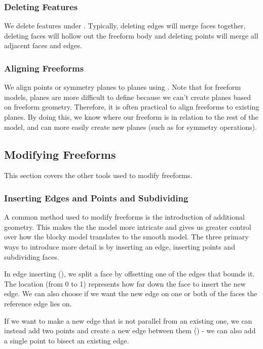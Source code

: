 \subsubsection{Deleting Features}
\easydifficulty
We delete features under . Typically, deleting edges will merge faces together, deleting faces will hollow out the freeform body and deleting points will merge all adjacent faces and edges.

\subsubsection{Aligning Freeforms}
We align points or symmetry planes to planes using . Note that for freeform models, planes are more difficult to define because we can't create planes based on freeform geometry. Therefore, it is often practical to align freeforms to existing planes. By doing this, we know where our freeform is in relation to the rest of the model, and can more easily create new planes (such as for symmetry operations).

\subsection{Modifying Freeforms}

This section covers the other tools used to modify freeforms.

\subsubsection{Inserting Edges and Points and Subdividing}

A common method used to modify freeforms is the introduction of additional geometry. This makes the the model more intricate and gives us greater control over how the blocky model translates to the smooth model. The three primary ways to introduce more detail is by inserting an edge, inserting points and subdividing faces.

In edge inserting (), we split a face by offsetting one of the edges that bounds it. The location (from 0 to 1) represents how far down the face to insert the new edge. We can also choose if we want the new edge on one or both of the faces the reference edge lies on. 

If we want to make a new edge that is not parallel from an existing one, we can instead add two points and create a new edge between them () - we can also add a single point to bisect an existing edge. 

